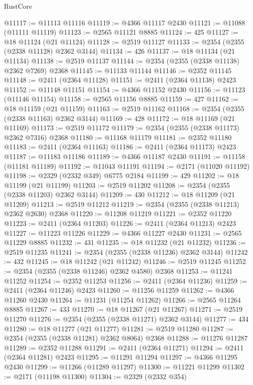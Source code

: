 \begin{lexlean}{RustCore}
\begin{coremodule}
@11117 := @11113 @11116
@11119 := @4366 @11117 @2430
@11121 := @11088 (@11111 @11119)
@11123 := @2565 @11121 @8885
@11124 := 425
@11127 := @18 @11124 (@21 @11124)
@11128 := @2519 @11127
@11133 := @2354 (@2355 (@2338 @11128) @2362 @3144)
@11134 := 426
@11137 := @18 @11134 (@21 @11134)
@11138 := @2519 @11137
@11144 := @2354 (@2355 (@2338 @11138) @2362 @7269) @2368
@11145 := @11133 @11144
@11146 := @2352 @11145
@11148 := @2411 (@2364 @11128)
@11151 := @2411 (@2364 @11138) @2423
@11152 := @11148 @11151
@11154 := @4366 @11152 @2430
@11156 := @11123 (@11146 @11154)
@11158 := @2565 @11156 @8885
@11159 := 427
@11162 := @18 @11159 (@21 @11159)
@11163 := @2519 @11162
@11168 := @2354 (@2355 (@2338 @11163) @2362 @3144)
@11169 := 428
@11172 := @18 @11169 (@21 @11169)
@11173 := @2519 @11172
@11179 := @2354 (@2355 (@2338 @11173) @2362 @7316) @2368
@11180 := @11168 @11179
@11181 := @2352 @11180
@11183 := @2411 (@2364 @11163)
@11186 := @2411 (@2364 @11173) @2423
@11187 := @11183 @11186
@11189 := @4366 @11187 @2430
@11191 := @11158 (@11181 @11189)
@11192 := @11043 @11191
@11194 := @2171 (@11020 @11192)
@11198 := @2329 (@2332 @349) @6775 @2184
@11199 := 429
@11202 := @18 @11199 (@21 @11199)
@11203 := @2519 @11202
@11208 := @2354 (@2355 (@2338 @11203) @2362 @3144)
@11209 := 430
@11212 := @18 @11209 (@21 @11209)
@11213 := @2519 @11212
@11219 := @2354 (@2355 (@2338 @11213) @2362 @2630) @2368
@11220 := @11208 @11219
@11221 := @2352 @11220
@11223 := @2411 (@2364 @11203)
@11226 := @2411 (@2364 @11213) @2423
@11227 := @11223 @11226
@11229 := @4366 @11227 @2430
@11231 := @2565 @11229 @8885
@11232 := 431
@11235 := @18 @11232 (@21 @11232)
@11236 := @2519 @11235
@11241 := @2354 (@2355 (@2338 @11236) @2362 @3144)
@11242 := 432
@11245 := @18 @11242 (@21 @11242)
@11246 := @2519 @11245
@11252 := @2354 (@2355 (@2338 @11246) @2362 @4580) @2368
@11253 := @11241 @11252
@11254 := @2352 @11253
@11256 := @2411 (@2364 @11236)
@11259 := @2411 (@2364 @11246) @2423
@11260 := @11256 @11259
@11262 := @4366 @11260 @2430
@11264 := @11231 (@11254 @11262)
@11266 := @2565 @11264 @8885
@11267 := 433
@11270 := @18 @11267 (@21 @11267)
@11271 := @2519 @11270
@11276 := @2354 (@2355 (@2338 @11271) @2362 @3144)
@11277 := 434
@11280 := @18 @11277 (@21 @11277)
@11281 := @2519 @11280
@11287 := @2354 (@2355 (@2338 @11281) @2362 @8064) @2368
@11288 := @11276 @11287
@11289 := @2352 @11288
@11291 := @2411 (@2364 @11271)
@11294 := @2411 (@2364 @11281) @2423
@11295 := @11291 @11294
@11297 := @4366 @11295 @2430
@11299 := @11266 (@11289 @11297)
@11300 := @11221 @11299
@11302 := @2171 (@11198 @11300)
@11304 := @2329 (@2332 @354)

\end{coremodule}
\end{lexlean}
